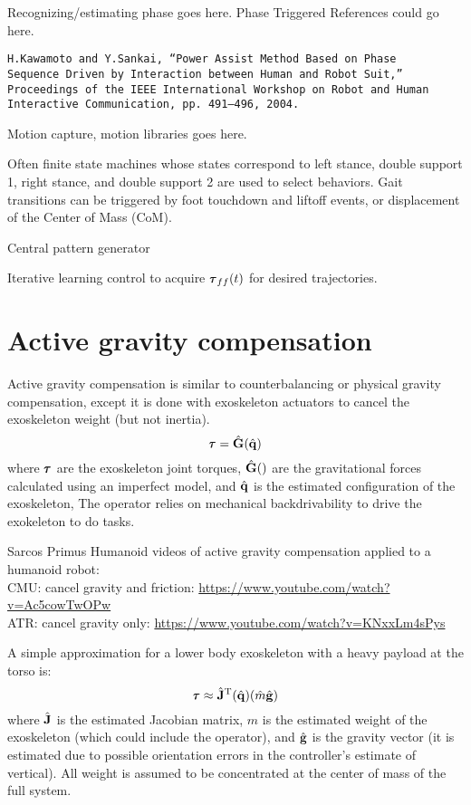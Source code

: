 \documentclass[letterpaper,12pt,fullpage]{article}
\begin{document}
Recognizing/estimating phase goes here.
Phase Triggered References could go here.
\begin{verbatim}
H.Kawamoto and Y.Sankai, “Power Assist Method Based on Phase
Sequence Driven by Interaction between Human and Robot Suit,”
Proceedings of the IEEE International Workshop on Robot and Human
Interactive Communication, pp. 491–496, 2004.
\end{verbatim}

Motion capture, motion libraries goes here.

Often finite state machines whose states correspond to left stance, double support 1,
right stance, and double support 2 are used to select behaviors. Gait transitions
can be triggered by foot touchdown and liftoff events, or
displacement of the Center of Mass (CoM).

Central pattern generator

Iterative learning control to acquire $\vtau_{ff}(t)$ for desired trajectories.

\section{Active gravity compensation}

Active gravity compensation is similar 
to counterbalancing or physical gravity compensation, except it is done
with exoskeleton actuators to cancel the exoskeleton weight (but not inertia).
\begin{equation}
\vtau = \hat{\mG}(\hat{\vq})
\end{equation}
where $\vtau$ are the exoskeleton joint torques, 
$\hat{{\bf G}}()$ are the gravitational forces calculated using an imperfect model, 
and $\hat{{\bf q}}$ is the estimated configuration of the exoskeleton,
The operator relies on mechanical backdrivability to drive
the exokeleton to do tasks.

Sarcos Primus Humanoid videos of active gravity compensation applied
to a humanoid robot:\\
CMU: cancel gravity and friction: \url{https://www.youtube.com/watch?v=Ac5cowTwOPw}\\
ATR: cancel gravity only: \url{https://www.youtube.com/watch?v=KNxxLm4sPys}

A simple approximation for a lower body exoskeleton with a heavy payload at the
torso is:
\begin{equation}
\vtau \approx \hat{\mJ}^{\tr}(\hat{\vq}) (\hat{m} \hat{\vg})
\end{equation}
where $\hat{{\bf J}}$ is the estimated Jacobian matrix,
$\hat{m}$ is the estimated
weight of the exoskeleton (which could include the operator),
and $\hat{{\bf g}}$ is the gravity vector (it is estimated due to possible orientation
errors in the controller's estimate of vertical).
All weight is assumed to be concentrated at the center of mass of the full system.
\end{document}
